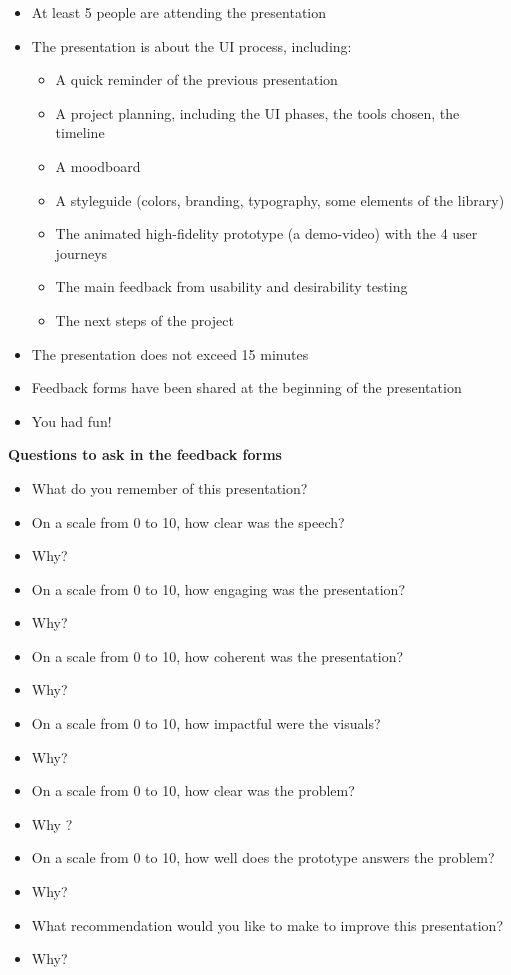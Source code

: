 \begin{itemize}
\item At least 5 people are attending the presentation
\item The presentation is about the UI process, including:
\begin{itemize}
\item A quick reminder of the previous presentation
\item A project planning, including the UI phases, the tools chosen, the timeline
\item A moodboard
\item A styleguide (colors, branding, typography, some elements of the library)
\item The animated high-fidelity prototype (a demo-video) with the 4 user journeys
\item The main feedback from usability and desirability testing
\item The next steps of the project
\end{itemize}
\item The presentation does not exceed 15 minutes
\item Feedback forms have been shared at the beginning of the presentation
\item You had fun!
\end{itemize}

\textbf{Questions to ask in the feedback forms}

\begin{itemize}
\item What do you remember of this presentation?
\item On a scale from 0 to 10, how clear was the speech?
\item Why?
\item On a scale from 0 to 10, how engaging was the presentation?
\item Why?
\item On a scale from 0 to 10, how coherent was the presentation?
\item Why?
\item On a scale from 0 to 10, how impactful were the visuals?
\item Why?
\item On a scale from 0 to 10, how clear was the problem?
\item Why ?
\item On a scale from 0 to 10, how well does the prototype answers the problem?
\item Why?
\item What recommendation would you like to make to improve this presentation?
\item Why?
\end{itemize}

